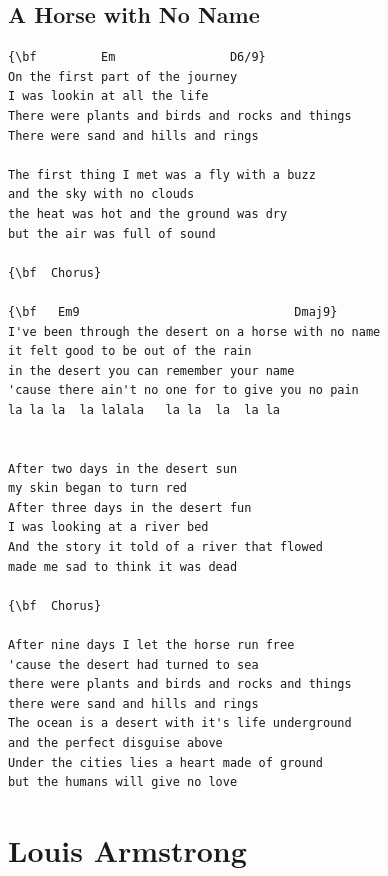\documentclass[a4paper]{article}
\begin{document}
\subsection{A Horse with No Name}
\begin{Verbatim}[commandchars=\\\{\}]
{\bf         Em                D6/9}
On the first part of the journey
I was lookin at all the life
There were plants and birds and rocks and things
There were sand and hills and rings

The first thing I met was a fly with a buzz
and the sky with no clouds
the heat was hot and the ground was dry
but the air was full of sound

{\bf  Chorus}

{\bf   Em9                              Dmaj9}
I've been through the desert on a horse with no name
it felt good to be out of the rain
in the desert you can remember your name
'cause there ain't no one for to give you no pain
la la la  la lalala   la la  la  la la


After two days in the desert sun
my skin began to turn red
After three days in the desert fun
I was looking at a river bed
And the story it told of a river that flowed
made me sad to think it was dead

{\bf  Chorus}

After nine days I let the horse run free
'cause the desert had turned to sea
there were plants and birds and rocks and things
there were sand and hills and rings
The ocean is a desert with it's life underground
and the perfect disguise above
Under the cities lies a heart made of ground
but the humans will give no love

\end{Verbatim}
\newpage
\section{Louis Armstrong}
\end{document}
